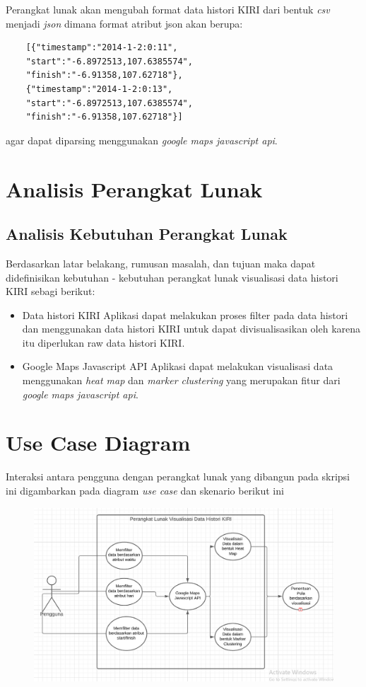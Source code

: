 Perangkat lunak akan mengubah format data histori KIRI dari bentuk  \textit{csv} menjadi \textit{json} dimana format atribut json akan berupa:
\begin{verbatim}
    [{"timestamp":"2014-1-2:0:11",
    "start":"-6.8972513,107.6385574",
    "finish":"-6.91358,107.62718"},
    {"timestamp":"2014-1-2:0:13",
    "start":"-6.8972513,107.6385574",
    "finish":"-6.91358,107.62718"}]
\end{verbatim}
agar dapat diparsing menggunakan \textit{google maps javascript api}.

\section{Analisis Perangkat Lunak}
\subsection{Analisis Kebutuhan Perangkat Lunak}
Berdasarkan latar belakang, rumusan masalah, dan tujuan maka dapat didefinisikan kebutuhan - kebutuhan perangkat lunak visualisasi data histori KIRI sebagi berikut:
\begin{itemize}
    \item Data histori KIRI
    Aplikasi dapat melakukan proses filter pada data histori dan menggunakan data histori KIRI untuk dapat divisualisasikan oleh karena itu diperlukan raw data histori KIRI.
    
    \item Google Maps Javascript API
    Aplikasi dapat melakukan visualisasi data menggunakan \textit{heat map} dan \textit{marker clustering} yang merupakan fitur dari \textit{google maps javascript api}.
    
\end{itemize}
\section{Use Case Diagram}
Interaksi antara pengguna dengan perangkat lunak yang dibangun pada skripsi ini digambarkan pada diagram \textit{use case} dan skenario berikut ini
\begin{figure}[H]
	\centering  
	\includegraphics[scale=0.55]{Gambar/usecase.PNG}  
	\caption[Use Case]
	\label{fig:usecase} 
\end{figure} 
